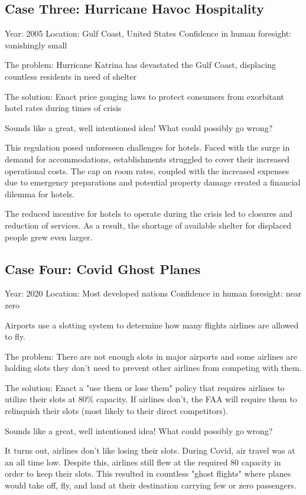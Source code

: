 \documentclass{article}
\begin{document}
\subsection{Case Three: Hurricane Havoc Hospitality}

Year: 2005
Location: Gulf Coast, United States
Confidence in human foresight: vanishingly small

The problem: Hurricane Katrina has devastated the Gulf Coast, displacing countless
residents in need of shelter

The solution: Enact price gouging laws to protect consumers from exorbitant
hotel rates during times of crisis

Sounds like a great, well intentioned idea! What could possibly go wrong?

This regulation posed unforeseen challenges for hotels. Faced with the surge in
demand for accommodations, establishments struggled to cover their increased
operational costs. The cap on room rates, coupled with the increased expenses
due to emergency preparations and potential property damage created a financial
dilemma for hotels.

The reduced incentive for hotels to operate during the crisis led to closures
and reduction of services. As a result, the shortage of available shelter for
displaced people grew even larger.

\subsection{Case Four: Covid Ghost Planes}

Year: 2020
Location: Most developed nations
Confidence in human foresight: near zero

Airports use a slotting system to determine how many flights airlines are
allowed to fly.

The problem: There are not enough slots in major airports and some airlines are
holding slots they don't need to prevent other airlines from competing with
them.

The solution: Enact a "use them or lose them" policy that requires airlines to
utilize their slots at 80\% capacity. If airlines don't, the FAA will require
them to relinquish their slots (most likely to their direct competitors).

Sounds like a great, well intentioned idea! What could possibly go wrong?

It turns out, airlines don't like losing their slots. During Covid, air travel
was at an all time low. Despite this, airlines still flew at the required 80%
capacity in order to keep their slots. This resulted in countless "ghost
flights" where planes would take off, fly, and land at their destination
carrying few or zero passengers.
\end{document}
